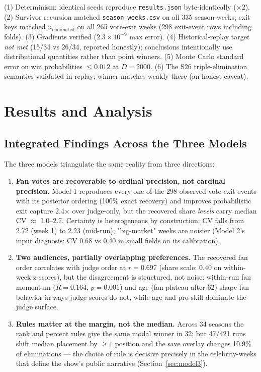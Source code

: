 \documentclass[11pt]{article}
\begin{document}
(1) Determinism: identical seeds reproduce \texttt{results.json}
byte-identically ($\times 2$). (2) Survivor recursion matched
\texttt{season\_weeks.csv} on all 335 season-weeks; exit keys matched
$n_{\text{eliminated}}$ on all 265 vote-exit weeks (298 exit-event rows including
folds). (3) Gradients verified ($2.3\times 10^{-9}$ max error). (4)
Historical-replay target \emph{not met} (15/34 vs 26/34, reported honestly);
conclusions intentionally use distributional quantities rather than point
winners. (5) Monte Carlo standard error on win probabilities $\le 0.012$ at
$D=2000$. (6) The S26 triple-elimination semantics validated in replay; winner
matches weakly there (an honest caveat).

\section{Results and Analysis}
\label{sec:results-integrated}

\subsection{Integrated Findings Across the Three Models}

The three models triangulate the same reality from three directions:

\begin{enumerate}[leftmargin=2em]
\item \textbf{Fan votes are recoverable to ordinal precision, not cardinal
precision.} Model 1 reproduces every one of the 298 observed vote-exit events with
its posterior ordering (100\% exact recovery) and improves probabilistic exit
capture 2.4$\times$ over judge-only, but the recovered share \emph{levels} carry
median CV $\approx$ 1.0--2.7. Certainty is heterogeneous by construction: CV falls
from 2.72 (week 1) to 2.23 (mid-run); "big-market" weeks are noisier (Model 2's
input diagnosis: CV 0.68 vs 0.40 in small fields on its calibration).
\item \textbf{Two audiences, partially overlapping preferences.} The recovered fan
order correlates with judge order at $r = 0.697$ (share scale; 0.40 on within-week
z-scores), but the disagreement is structured, not noise: within-run fan momentum
($R = 0.164$, $p = 0.001$) and age (fan plateau after 62) shape fan behavior in
ways judge scores do not, while age and pro skill dominate the judge surface.
\item \textbf{Rules matter at the margin, not the median.} Across 34 seasons the
rank and percent rules give the same modal winner in 32; but 47/421 runs shift
median placement by $\ge 1$ position and the save overlay changes 10.9\% of
eliminations --- the choice of rule is decisive precisely in the celebrity-weeks
that define the show's public narrative (Section~\ref{sec:model3}).
\end{enumerate}
\end{document}
